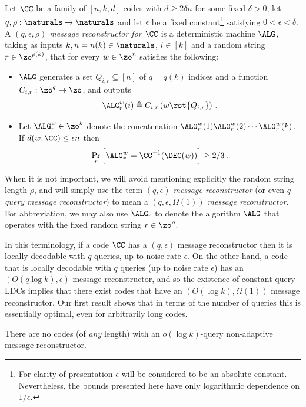 \begin{definition} \label{def:msg_recon}
Let $\CC$ be a family of $[n,k,d]$ codes with $d \geq 2\delta n$ for some fixed $\delta > 0$, let $q,\rho:\naturals \to \naturals$ and let $\epsilon$ be a fixed constant\footnote{For clarity of presentation $\epsilon$ will be considered to be an absolute constant. Nevertheless, the bounds presented here have only logarithmic dependence on $1/\epsilon$.} satisfying $0 < \epsilon < \delta$.
A \emph{$(q,\epsilon,\rho)$ message reconstructor for $\CC$} is a deterministic machine $\ALG$, taking as inputs $k,n=n(k) \in \naturals$, $i\in [k]$ and a random string $r \in \zo^{\rho(k)}$, that for every $w \in \zo^n$ satisfies the following:
\begin{itemize}

\item $\ALG$ generates a set $Q_{i,r} \subseteq [n]$ of $q=q(k)$ indices and a function $C_{i,r}:\zo^q \to \zo$, and outputs
\[
\ALG^w_r(i) \triangleq C_{i,r}\left(w\rst{Q_{i,r}}\right)\,.
\]

\item Let $\ALG^w_r \in \zo^k$ denote the concatenation $\ALG^w_r(1)
  \ALG^w_r(2)  \cdots  \ALG^w_r(k)$. 
If $d(w,\CC) \leq \epsilon n$ then
\[
\Pr_r\Big[\ALG^w_r = \CC^{-1}(\DEC(w))\Big] \geq 2/3\,.
\]
\end{itemize}
When it is not important, we will avoid mentioning explicitly the random string length $\rho$, and will simply use the term \emph{$(q,\epsilon)$ message reconstructor} (or even \emph{$q$-query message reconstructor}) to mean a \emph{$(q,\epsilon, \Omega(1))$ message reconstructor}. For abbreviation, we may also use $\ALG_r$ to denote the algorithm $\ALG$ that operates with the fixed random string $r \in \zo^\rho$.
\end{definition}
In this terminology, if a code $\CC$ has a $(q,\epsilon)$ message reconstructor then it is locally decodable with $q$ queries, up to noise rate $\epsilon$. On the other hand, a code that is locally decodable with $q$ queries (up to noise rate $\epsilon$) has an $(O(q \log k),\epsilon)$ message reconstructor, and so the existence of constant query LDCs implies that there exist codes that have an $(O(\log k),\Omega(1))$ message reconstructor. Our first result shows that in terms of the number of queries this is essentially optimal, even for arbitrarily long codes.

\begin{theorem}\label{theo:msg}
There are no codes (of \emph{any} length) with an $o(\log k)$-query non-adaptive message reconstructor.
\end{theorem}


